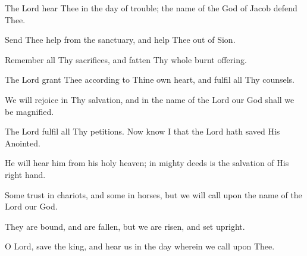 The Lord hear Thee in the day of trouble; the name of the God of Jacob defend Thee.

Send Thee help from the sanctuary, and help Thee out of Sion.

Remember all Thy sacrifices, and fatten Thy whole burnt offering.

The Lord grant Thee according to Thine own heart, and fulfil all Thy counsels.

We will rejoice in Thy salvation, and in the name of the Lord our God shall we be magnified.

The Lord fulfil all Thy petitions. Now know I that the Lord hath saved His Anointed.

He will hear him from his holy heaven; in mighty deeds is the salvation of His right hand.

Some trust in chariots, and some in horses, but we will call upon the name of the Lord our God.

They are bound, and are fallen, but we are risen, and set upright.

O Lord, save the king, and hear us in the day wherein we call upon Thee.
